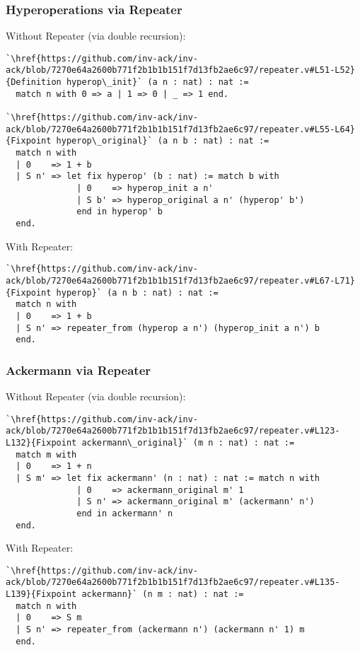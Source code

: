 \begin{frame}[fragile]
\frametitle{Hyperoperations via Repeater}
Without Repeater (via double recursion):
\begin{lstlisting}
`\href{https://github.com/inv-ack/inv-ack/blob/7270e64a2600b771f2b1b1b151f7d13fb2ae6c97/repeater.v#L51-L52}{Definition hyperop\_init}` (a n : nat) : nat :=
  match n with 0 => a | 1 => 0 | _ => 1 end.

`\href{https://github.com/inv-ack/inv-ack/blob/7270e64a2600b771f2b1b1b151f7d13fb2ae6c97/repeater.v#L55-L64}{Fixpoint hyperop\_original}` (a n b : nat) : nat :=
  match n with
  | 0    => 1 + b
  | S n' => let fix hyperop' (b : nat) := match b with
              | 0    => hyperop_init a n'
              | S b' => hyperop_original a n' (hyperop' b')
              end in hyperop' b
  end.
\end{lstlisting}

With Repeater:
\begin{lstlisting} 
`\href{https://github.com/inv-ack/inv-ack/blob/7270e64a2600b771f2b1b1b151f7d13fb2ae6c97/repeater.v#L67-L71}{Fixpoint hyperop}` (a n b : nat) : nat :=
  match n with
  | 0    => 1 + b
  | S n' => repeater_from (hyperop a n') (hyperop_init a n') b
  end.
\end{lstlisting}
\end{frame}


\begin{frame}[fragile]
\frametitle{Ackermann via Repeater}
Without Repeater (via double recursion):
\begin{lstlisting}
`\href{https://github.com/inv-ack/inv-ack/blob/7270e64a2600b771f2b1b1b151f7d13fb2ae6c97/repeater.v#L123-L132}{Fixpoint ackermann\_original}` (m n : nat) : nat :=
  match m with
  | 0    => 1 + n
  | S m' => let fix ackermann' (n : nat) : nat := match n with
              | 0    => ackermann_original m' 1
              | S n' => ackermann_original m' (ackermann' n')
              end in ackermann' n
  end.
\end{lstlisting}

With Repeater:
\begin{lstlisting}
`\href{https://github.com/inv-ack/inv-ack/blob/7270e64a2600b771f2b1b1b151f7d13fb2ae6c97/repeater.v#L135-L139}{Fixpoint ackermann}` (n m : nat) : nat :=
  match n with
  | 0    => S m
  | S n' => repeater_from (ackermann n') (ackermann n' 1) m
  end.
\end{lstlisting}
\end{frame}

%
